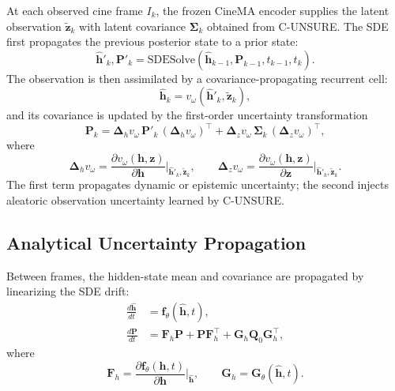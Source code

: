\documentclass[10pt,twocolumn]{article}
\begin{document}
At each observed cine frame $I_k$, the frozen CineMA encoder supplies the latent observation $\tilde{\bm{z}}_k$ with latent covariance $\bm{\Sigma}_k$ obtained from C-UNSURE. The SDE first propagates the previous posterior state to a prior state:
\begin{equation}
    \hat{\bm{h}}'_k, \bm{P}'_k =
    \mathrm{SDESolve}(\hat{\bm{h}}_{k-1},\bm{P}_{k-1},t_{k-1},t_k).
    \label{eq:sde_solve}
\end{equation}
The observation is then assimilated by a covariance-propagating recurrent cell:
\begin{equation}
    \hat{\bm{h}}_k = v_\omega(\hat{\bm{h}}'_k,\tilde{\bm{z}}_k),
    \label{eq:gru_update}
\end{equation}
and its covariance is updated by the first-order uncertainty transformation
\begin{equation}
    \bm{P}_k =
    \bm{\Delta}_h v_\omega\,\bm{P}'_k\,(\bm{\Delta}_h v_\omega)^\top
    +
    \bm{\Delta}_z v_\omega\,\bm{\Sigma}_k\,(\bm{\Delta}_z v_\omega)^\top ,
    \label{eq:cov_update}
\end{equation}
where
\begin{equation}
    \bm{\Delta}_h v_\omega =
    \frac{\partial v_\omega(\bm{h},\bm{z})}{\partial \bm{h}}
    \bigg|_{\hat{\bm{h}}'_k,\tilde{\bm{z}}_k},
    \qquad
    \bm{\Delta}_z v_\omega =
    \frac{\partial v_\omega(\bm{h},\bm{z})}{\partial \bm{z}}
    \bigg|_{\hat{\bm{h}}'_k,\tilde{\bm{z}}_k}.
    \label{eq:cvgru_jacs}
\end{equation}
The first term propagates dynamic or epistemic uncertainty; the second injects aleatoric observation uncertainty learned by C-UNSURE.

\subsection{Analytical Uncertainty Propagation}
\label{sec:analytical_uncertainty_clarified}

Between frames, the hidden-state mean and covariance are propagated by linearizing the SDE drift:
\begin{align}
    \frac{d\hat{\bm{h}}}{dt} &= \bm{f}_\theta(\hat{\bm{h}},t), \label{eq:mean_prop} \\
    \frac{d\bm{P}}{dt}
    &=
    \bm{F}_h\bm{P}
    + \bm{P}\bm{F}_h^\top
    + \bm{G}_h \bm{Q}_0 \bm{G}_h^\top,
    \label{eq:cov_prop}
\end{align}
where
\begin{equation}
    \bm{F}_h =
    \frac{\partial \bm{f}_\theta(\bm{h},t)}{\partial \bm{h}}
    \bigg|_{\hat{\bm{h}}},
    \qquad
    \bm{G}_h=\bm{G}_\theta(\hat{\bm{h}},t).
\end{equation}
\end{document}
